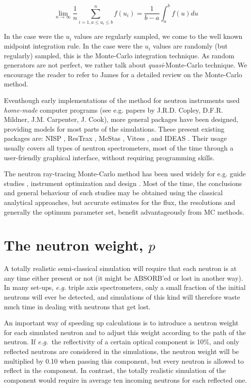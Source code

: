 \begin{equation}
\lim_{n \rightarrow \infty} \frac{1}{n} \sum_{i=1, a \leq u_i \leq b}^n f(u_i) = \frac{1}{b-a}\int_a^b f(u) du
\end{equation}

In the case were the $u_i$ values are regularly sampled, we come to the well known midpoint integration rule. In the case were the $u_i$ values are randomly (but regularly) sampled, this is the Monte-Carlo integration technique. As random generators are not perfect, we rather talk about \emph{quasi}-Monte-Carlo technique. We encourage the reader to refer to James \cite{James80} for a detailed review on the Monte-Carlo method.

Eventhough early implementations of the method for neutron instruments used \emph{home-made} computer programs  (see e.g. papers by J.R.D. Copley, D.F.R. Mildner, J.M. Carpenter, J. Cook), more general packages have been designed, providing models for most parts of the simulations.
These present existing packages are: NISP \cite{NISP}, ResTrax \cite{Restrax}, McStas \cite{nn_10_20,mcstas_pb,mcstas_webpage}, Vitess \cite{Vitess,vitess_webpage}, and IDEAS \cite{IDEAS}.
Their usage usually covers all types of neutron spectrometers, most of the time through a user-friendly graphical interface, without requiring programming skills.

The neutron ray-tracing Monte-Carlo method has been used widely for e.g. guide studies \cite{Copley93,Farhi02,Schanzer04}, instrument optimization and design \cite{Zsigmond04,Lieutenant05}. Most of the time, the conclusions and general behaviour of such studies may be obtained using the classical analytical approaches, but accurate estimates for the flux, the resolutions and generally the optimum parameter set, benefit advantageously from MC methods.

\section{The neutron weight, $p$}
\label{s:probweight}
A totally realistic semi-classical simulation will require that
each neutron is at any time either present or not
(it might be ABSORB'ed or lost in another way).
In many set-ups, {\em e.g.} triple axis spectrometers, only a
small fraction of the initial neutrons will ever be detected, and
simulations of this kind will therefore waste much time in dealing
with neutrons that get lost.

An important way of speeding up calculations is to introduce
a neutron weight for each simulated neutron and to
adjust this weight according to the path of the neutron.
If {\em e.g.}\ the reflectivity of a certain
optical component is 10\%, and only reflected neutrons are
considered in the simulations, the neutron
weight will be multiplied by 0.10 when passing this component,
but every neutron is allowed to reflect in the component.
In contrast, the totally realistic simulation of the component
would require in average ten incoming neutrons for each reflected one.

